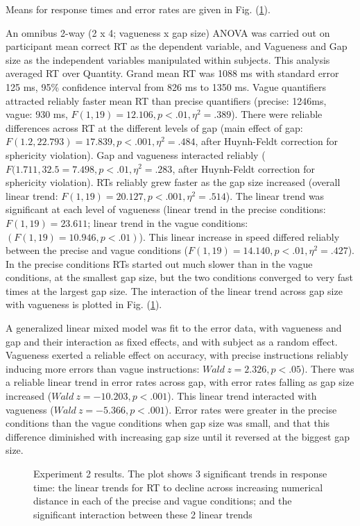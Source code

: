 \documentclass[doc,floatmark]{apa}
\begin{document}
Means for response times and error rates are given in Fig. (\ref{resultse2}).

An omnibus 2-way (2 x 4; vagueness x gap size) ANOVA was carried out on participant mean correct RT as the dependent variable, and Vagueness and Gap size as the independent variables manipulated within subjects. This analysis averaged RT over Quantity. Grand mean RT was 1088 ms with standard error 125 ms, 95\% confidence interval from 826 ms to 1350 ms. Vague quantifiers attracted reliably faster mean RT than precise quantifiers (precise: 1246ms, vague: 930 ms, $F(1,19)=12.106, p<.01, \eta^2=.389$). There were reliable differences across RT at the different levels of gap (main effect of gap: $F(1.2, 22.793)=17.839, p<.001, \eta^2= .484$, after Huynh-Feldt correction for sphericity violation). Gap and vagueness interacted reliably ($F(1.711, 32.5 = 7.498, p<.01, \eta^2=.283$, after Huynh-Feldt correction for sphericity violation). RTs reliably grew faster as the gap size increased (overall linear trend: $F(1,19)=20.127, p<.001,\eta^2=.514$). The linear trend was significant at each level of vagueness (linear trend in the precise conditions: $F(1,19)=23.611$; linear trend in the vague conditions: $(F(1,19)=10.946, p<.01)$). This linear increase in speed differed reliably between the precise and vague conditions ($F(1,19)=14.140,p<.01,\eta^2=.427$). In the precise conditions RTs started out much slower than in the vague conditions, at the smallest gap size, but the two conditions converged to very fast times at the largest gap size. The interaction of the linear trend across gap size with vagueness is plotted in Fig. (\ref{resultse2}).

\label{accann}
A generalized linear mixed model \cite{jaeger2008categorical} was fit to the error data, with vagueness and gap and their interaction as fixed effects, and with subject as a random effect. Vagueness exerted a reliable effect on accuracy, with precise instructions reliably inducing more errors  than vague instructions: $Wald~z = 2.326, p<.05$). There was a reliable linear trend in error rates across gap, with error rates falling as gap size increased ($Wald~z = -10.203, p<.001$). This linear trend interacted with vagueness ($Wald~z=-5.366,p<.001$). Error rates were greater in the precise conditions than the vague conditions when gap size was small, and that this difference diminished with increasing gap size until it reversed at the biggest gap size.

\begin{figure}[htbp]
\caption{Experiment 2 results. The plot shows 3 significant trends in response time:  the linear trends for RT to decline across increasing numerical distance in each of the precise and vague conditions; and the significant interaction between these 2 linear trends}
\label{resultse2}
\end{figure}
\end{document}
